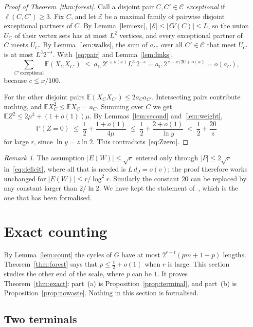 \documentclass[11pt]{article}
\theoremstyle{definition}
\theoremstyle{remark}
\newtheorem{remark}[theorem]{Remark}
\newcommand{\PP}{\mathbb{P}}
\newcommand{\EE}{\mathbb{E}}
\newcommand{\half}{\tfrac12}
\numberwithin{equation}{section}
\begin{document}
\begin{proof}[Proof of Theorem~\ref{thm:forest}]
Call a disjoint pair $C,C'\in\mathcal{C}$ \emph{exceptional} if $\ell(C,C')\ge3$. Fix $C$, and let
$\mathcal{E}$ be a maximal family of pairwise disjoint exceptional partners of $C$. By
Lemma~\ref{lem:exc}, $|\mathcal{E}|\le|\delta V(C)|\le L$, so the union $U_C$ of their vertex sets
has at most $L^{2}$ vertices, and every exceptional partner of $C$ meets $U_C$. By
Lemma~\ref{lem:walks}, the sum of $a_{C'}$ over all $C'\in\mathcal{C}$ that meet $U_C$ is at most
$L^{3}2^{-s}$. With~\eqref{eq:pair} and Lemma~\ref{lem:links},
\[
  \sum_{C'\ \mathrm{exceptional}}\EE(X_CX_{C'})\;\le\;a_C\,2^{c+o(x)}L^{3}\,2^{-s}
  =a_C\,2^{\,c-x/20+o(x)}=o(a_C),
\]
because $c\le x/100$.

For the other disjoint pairs $\EE(X_CX_{C'})\le2a_Ca_{C'}$. Intersecting pairs contribute nothing,
and $\EE X_C^{2}\le\EE X_C=a_C$. Summing over $C$ we get
$\EE Z^{2}\le2\mu^{2}+(1+o(1))\mu$. By Lemmas~\ref{lem:second} and~\ref{lem:weight},
\[
  \PP(Z=0)\;\le\;\frac12+\frac{1+o(1)}{4\mu}\;\le\;\frac12+\frac{2+o(1)}{\ln y}\;<\;\frac12+\frac{20}{z}
\]
for large $r$, since $\ln y=z\ln2$. This contradicts~\eqref{eq:Zzero}.
\end{proof}

\begin{remark}\label{rem:range}
The assumption $|E(W)|\le\sqrt r$ entered only through $|P|\le2\sqrt r$ in~\eqref{eq:deficit}, where
all that is needed is $L\,d_J=o(v)$; the proof therefore works unchanged for
$|E(W)|\le r/\log^{2}r$. Similarly the constant $20$ can be replaced by any constant larger than
$2/\ln2$. We have kept the statement of~\cite{KNT}, which is the one that has been formalised.
\end{remark}
\section{Exact counting}\label{sec:exact}

By Lemma~\ref{lem:count} the cycles of $G$ have at most $2^{r-t}(pm+1-p)$ lengths.
Theorem~\ref{thm:forest} says that $p\le\half+o(1)$ when $r$ is large. This section studies the
other end of the scale, where $p$ can be $1$. It proves Theorem~\ref{thm:exact}: part~(a) is
Proposition~\ref{prop:terminal}, and part~(b) is Proposition~\ref{prop:nowaste}. Nothing in this
section is formalised.

\subsection{Two terminals}
\end{document}
